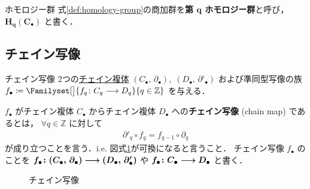 \documentclass[algtopo_main]{subfiles}
\begin{document}
\begin{mydef}[label=def:homology-group]{ホモロジー群}
    式\eqref{def:homology-group}の商加群を\textbf{第 $\bm{q}$ ホモロジー群}と呼び，$\bm{H_q(C_\bullet)}$ と書く．
\end{mydef}


\subsection{チェイン写像}

\begin{mydef}[label=def:chainmap, breakable]{チェイン写像}
    2つの\hyperref[def:CC]{チェイン複体} $(C_\bullet,\, \partial_\bullet),\; (D_\bullet,\, \partial'_\bullet) $ 
    および準同型写像の族 $f_\bullet \coloneqq \Familyset[\big]{f_q \colon C_q \lto D_q}{q\in \mathbb{Z}}$ 
    を与える．

    $f_\bullet$ がチェイン複体 $C_\bullet$ からチェイン複体 $D_\bullet$ への\textbf{チェイン写像} (chain map) であるとは，
    $\forall q \in \mathbb{Z}$ に対して
    \begin{align}
        \partial'_q \circ f_q = f_{q-1} \circ \partial_q
    \end{align}
    が成り立つことを言う．i.e. 図式\ref{fig:chainmap}が可換になると言うこと．
    チェイン写像 $f_\bullet$ のことを $\bm{f_\bullet \colon (C_\bullet,\, \partial_\bullet) \longrightarrow (D_\bullet,\, \partial'_\bullet)}$ や $\bm{f_\bullet \colon C_\bullet \longrightarrow D_\bullet}$ と書く．
\end{mydef}

\begin{figure}[H]
    \centering
    \caption{チェイン写像}
    \label{fig:chainmap}
\end{figure}%
\end{document}

